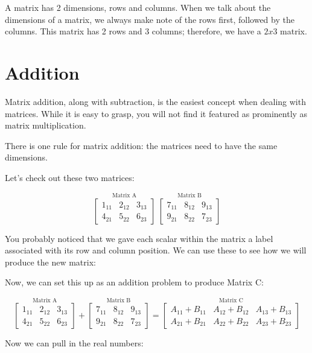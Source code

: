 \documentclass[
  letterpaper,
]{krantz}
\begin{document}
A matrix has 2 dimensions, rows and columns. When we talk about the
dimensions of a matrix, we always make note of the rows first, followed
by the columns. This matrix has 2 rows and 3 columns; therefore, we have
a \(2x3\) matrix.

\section{Addition}\label{addition}

Matrix addition, along with subtraction, is the easiest concept when
dealing with matrices. While it is easy to grasp, you will not find it
featured as prominently as matrix multiplication.

There is one rule for matrix addition: the matrices need to have the
same dimensions.

Let's check out these two matrices:

\[
\stackrel{\mbox{Matrix A}}{
\begin{bmatrix}
1_{11} & 2_{12} & 3_{13}\\
4_{21} & 5_{22} & 6_{23}
\end{bmatrix}
}  
\ 
\stackrel{\mbox{Matrix B}}{
\begin{bmatrix}
7_{11} & 8_{12} & 9_{13}\\
9_{21} & 8_{22} & 7_{23}
\end{bmatrix} 
}
\]

You probably noticed that we gave each scalar within the matrix a label
associated with its row and column position. We can use these to see how
we will produce the new matrix:

Now, we can set this up as an addition problem to produce Matrix C:

\[
\stackrel{\mbox{Matrix A}}{
\begin{bmatrix}
1_{11} & 2_{12} & 3_{13}\\
4_{21} & 5_{22} & 6_{23}
\end{bmatrix}
}  
+ 
\stackrel{\mbox{Matrix B}}{
\begin{bmatrix}
7_{11} & 8_{12} & 9_{13}\\
9_{21} & 8_{22} & 7_{23}
\end{bmatrix} 
}
=
\stackrel{\mbox{Matrix C}}{
\begin{bmatrix}
A_{11} + B_{11}& A_{12} + B_{12} & A_{13} + B_{13}\\
A_{21} + B_{21}& A_{22} + B_{22} & A_{23} + B_{23}
\end{bmatrix}
}
\]

Now we can pull in the real numbers:
\end{document}
